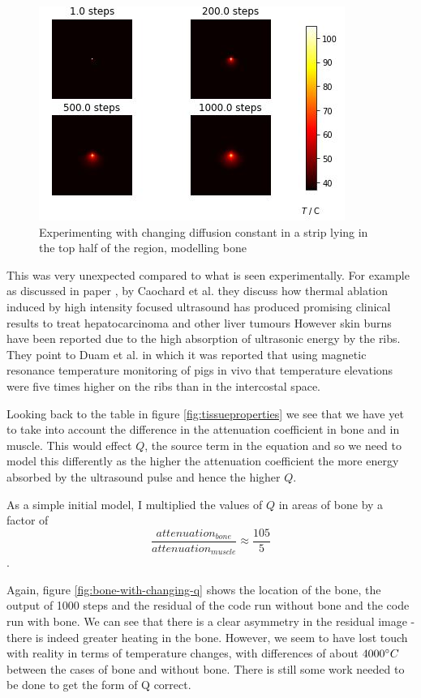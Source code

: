 \documentclass[11pt]{article} %
\begin{document}
\begin{figure}
	\centering
	\includegraphics[width=0.8\linewidth]{"Report_images/change diffusion constant"}
	\caption{Experimenting with changing diffusion constant in a strip lying in the top half of the region, modelling bone}
	\label{fig:change-diffusion-constant}
\end{figure}

This was very unexpected compared to what is seen  experimentally. For example as discussed in paper \cite{Cochard2009}, by Caochard et al. they discuss how thermal ablation induced by high intensity focused ultrasound has produced promising clinical results to treat hepatocarcinoma and other liver tumours However skin burns have been reported due to the high absorption of ultrasonic energy by the ribs. They point to Duam et al. \cite{Daum1999}  in which it was reported that using magnetic resonance temperature monitoring of pigs in vivo that  temperature elevations were five times higher on the ribs than in the intercostal space. 

Looking back to the table in figure \ref{fig:tissueproperties} we see that we have yet to take into account the difference in the  attenuation coefficient in bone and in muscle. This would effect $ Q $, the source term in the equation and so we need to model this differently as the higher the attenuation coefficient the more energy absorbed by the ultrasound pulse and hence the higher $ Q $. 

  
 As a simple initial model, I multiplied the values of $ Q $ in areas of bone by a factor of $$ \frac{attenuation_{bone}}{attenuation_{muscle}} \approx \frac{105}{5} $$. 
 
 Again, figure  \ref{fig:bone-with-changing-q} shows the location of the bone, the output of 1000 steps and  the residual of the code run without bone and the code run with bone. We can see that there is a clear asymmetry in the residual image - there is indeed greater heating in the bone.  However, we seem to have lost touch with reality in terms of temperature changes, with differences of about $ 4000 \degree C $ between the cases of bone and without bone. There is still some work needed to be done to get the form of Q correct. 
 
\end{document}

